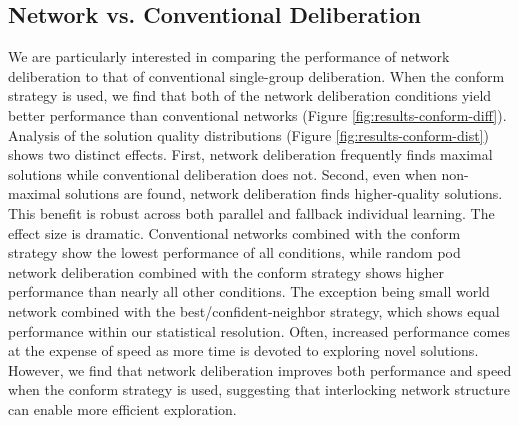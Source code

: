 \subsection{Network vs. Conventional Deliberation}
We are particularly interested in comparing the performance of network deliberation to that of conventional single-group deliberation. When the conform strategy is used, we find that both of the network deliberation conditions yield better performance than conventional networks (Figure \ref{fig:results-conform-diff}). Analysis of the solution quality distributions (Figure \ref{fig:results-conform-dist}) shows two distinct effects. First, network deliberation frequently finds maximal solutions while conventional deliberation does not. Second, even when non-maximal solutions are found, network deliberation finds higher-quality solutions. This benefit is robust across both parallel and fallback individual learning. The effect size is dramatic. Conventional networks combined with the conform strategy show the lowest performance of all conditions, while random pod network deliberation combined with the conform strategy shows higher performance than nearly all other conditions. The exception being small world network combined with the best/confident-neighbor strategy, which shows equal performance within our statistical resolution. 
Often, increased performance comes at the expense of speed as more time is devoted to exploring novel solutions. However, we find that network deliberation improves both performance and speed when the conform strategy is used, suggesting that interlocking network structure can enable more efficient exploration.

